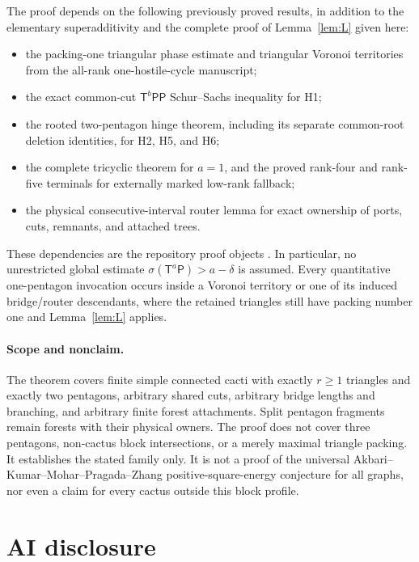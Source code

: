 \documentclass[11pt]{article}
\theoremstyle{remark}
\newcommand{\sig}{\sigma}
\newcommand{\T}{\mathsf T}
\newcommand{\Pp}{\mathsf P}
\begin{document}
The proof depends on the following previously proved results, in addition to
the elementary superadditivity and the complete proof of Lemma~\ref{lem:L}
given here:
\begin{itemize}
\item the packing-one triangular phase estimate and triangular Voronoi
territories from the all-rank one-hostile-cycle manuscript;
\item the exact common-cut $\T^b\Pp\Pp$ Schur--Sachs inequality for H1;
\item the rooted two-pentagon hinge theorem, including its separate
common-root deletion identities, for H2, H5, and H6;
\item the complete tricyclic theorem for $a=1$, and the proved rank-four and
rank-five terminals for externally marked low-rank fallback;
\item the physical consecutive-interval router lemma for exact ownership of
ports, cuts, remnants, and attached trees.
\end{itemize}
These dependencies are the repository proof objects
\cite{Hostile,CommonCut,Hinge,Tricyclic,Tetracyclic,Pentacyclic,Router}.
In particular, no unrestricted global estimate
$\sig(\T^a\Pp)>a-\delta$ is assumed.  Every quantitative one-pentagon
invocation occurs inside a Voronoi territory or one of its induced
bridge/router descendants, where the retained triangles still have packing
number one and Lemma~\ref{lem:L} applies.

\paragraph{Scope and nonclaim.}
The theorem covers finite simple connected cacti with exactly $r\geq1$
triangles and exactly two pentagons, arbitrary shared cuts, arbitrary bridge
lengths and branching, and arbitrary finite forest attachments.  Split
pentagon fragments remain forests with their physical owners.  The proof does
not cover three pentagons, non-cactus block intersections, or a merely maximal
triangle packing.  It establishes the stated family only.  It is not a proof
of the universal Akbari--Kumar--Mohar--Pragada--Zhang positive-square-energy
conjecture for all graphs, nor even a claim for every cactus outside this block
profile.

\section*{AI disclosure}
\end{document}
